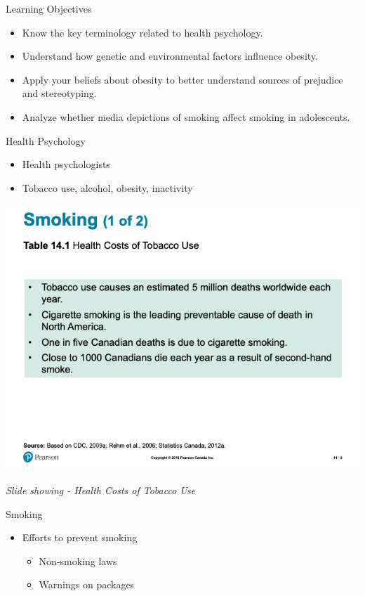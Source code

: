 \documentclass[
]{book}
\providecommand{\tightlist}{%
  \setlength{\itemsep}{0pt}\setlength{\parskip}{0pt}}
\begin{document}
\begin{reflect}
Learning Objectives

\begin{itemize}
\tightlist
\item
  Know the key terminology related to health psychology.\\
\item
  Understand how genetic and environmental factors influence obesity.\\
\item
  Apply your beliefs about obesity to better understand sources of prejudice and stereotyping.\\
\item
  Analyze whether media depictions of smoking affect smoking in adolescents.
\end{itemize}

Health Psychology

\begin{itemize}
\tightlist
\item
  Health psychologists\\
\item
  Tobacco use, alcohol, obesity, inactivity
\end{itemize}

\includegraphics{assets/unit_8/slide_9.png}

\emph{Slide showing - Health Costs of Tobacco Use}

Smoking

\begin{itemize}
\tightlist
\item
  Efforts to prevent smoking

  \begin{itemize}
  \tightlist
  \item
    Non-smoking laws\\
  \item
    Warnings on packages
  \end{itemize}
\end{itemize}


\end{reflect}
\end{document}
